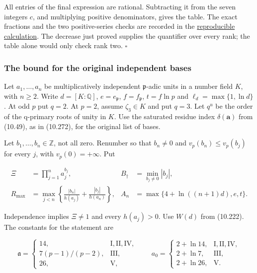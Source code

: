\documentclass[
  11pt,
  a4paper,
]{article}
\begin{document}
All entries of the final expression are rational. Subtracting it from
the seven integers \(c\), and multiplying positive denominators, gives
the table. The exact fractions and the two positive-series checks are
recorded in the
\href{../figure_sources/yu_first_main_bound_certificate.py}{reproducible
calculation}. The decrease just proved supplies the quantifier over
every rank; the table alone would only check rank two. \(\square\)

\subsubsection{The bound for the original independent
bases}\label{the-bound-for-the-original-independent-bases}

Let \(a_1,\ldots,a_n\) be multiplicatively independent
\(\mathfrak p\)-adic units in a number field \(K\), with \(n\ge2\).
Write \(d=[K:\mathbb Q]\), \(e=e_{\mathfrak p}\), \(f=f_{\mathfrak p}\),
\(t=f\ln p\) and \(\ell_d=\max\{1,\ln d\}\). At odd \(p\) put \(q=2\).
At \(p=2\), assume \(\zeta_3\in K\) and put \(q=3\). Let \(q^u\) be the
order of the q-primary roots of unity in \(K\). Use the saturated
residue index \(\delta(\boldsymbol a)\) from (10.49), as in (10.272),
for the original list of bases.

Let \(b_1,\ldots,b_n\in\mathbb Z\), not all zero. Renumber so that
\(b_n\ne0\) and \(v_p(b_n)\le v_p(b_j)\) for every \(j\), with
\(v_p(0)=+\infty\). Put

\[
\begin{aligned}
\Xi&=\prod_{j=1}^na_j^{b_j},&
B_\dagger&=\min_{b_j\ne0}|b_j|,\\
R_{\max}&=\max_{j<n}
\left\{\frac{|b_n|}{h(a_j)}+\frac{|b_j|}{h(a_n)}\right\},&
A_n&=\max\{4+\ln((n+1)d),e,t\}.
\end{aligned}
\tag{10.447}
\]

Independence implies \(\Xi\ne1\) and every \(h(a_j)>0\). Use \(W(d)\)
from (10.222). The constants for the statement are

\[
\mathfrak a=\begin{cases}
14,&\mathrm{I,II,IV},\\
7(p-1)/(p-2),&\mathrm{III},\\
26,&\mathrm V,
\end{cases}
\qquad
a_0=\begin{cases}
2+\ln14,&\mathrm{I,II,IV},\\
2+\ln7,&\mathrm{III},\\
2+\ln26,&\mathrm V.
\end{cases}
\tag{10.448}
\]
\end{document}
